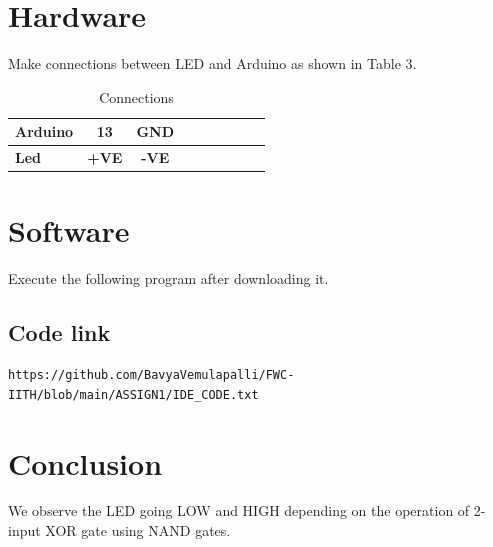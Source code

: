 \documentclass[10pt, a4paper]{article}
\begin{document}
\section{Hardware}

Make connections between LED and Arduino as shown in Table 3.

\begin{table}[H]
 \begin{center}
    \begin{tabular}{|l|c|c|c|c|c|c|c|c} \hline\textbf{Arduino} & \textbf{13} & \textbf{GND} \\ \hline
 \textbf{Led} & \textbf{+VE} & \textbf{-VE}\\ \hline
\end{tabular}   
\end{center}
\caption{Connections}
\label{table 3}
\end{table}


\section{Software}

Execute the following program after downloading it.

\subsection{Code link}
\vspace{5mm}
\begin{lstlisting}
https://github.com/BavyaVemulapalli/FWC-IITH/blob/main/ASSIGN1/IDE_CODE.txt
\end{lstlisting}

\section{Conclusion}
We observe the LED going LOW and HIGH depending on the operation of 2-input XOR gate using NAND gates.
\end{document}
